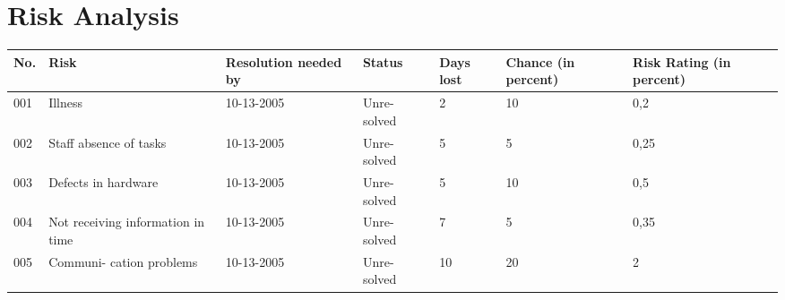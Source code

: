 \section{Risk Analysis}

\begin{tabularx}{\linewidth}{|l|p{2.5cm}|p{1.5cm}|p{1.2cm}|p{0.9cm}|p{1cm}|X|}
\hline
\textbf{No.} & \textbf{Risk} & \textbf{Resolution needed by}& \textbf{Status}& \textbf{Days lost}& \textbf{Chance (in percent)}& \textbf{Risk Rating (in percent)}\\
\hline
001 & Illness & 10-13-2005 & Unre- solved & 2 & 10 & 0,2\\
\hline
002 & Staff absence of tasks & 10-13-2005 & Unre- solved & 5 & 5 & 0,25\\
\hline
003 & Defects in hardware & 10-13-2005 & Unre- solved & 5 & 10 & 0,5\\
\hline
004 & Not receiving information in time & 10-13-2005 & Unre- solved & 7 & 5 & 0,35\\
\hline
005 & Communi- cation problems & 10-13-2005 & Unre- solved & 10 & 20 & 2\\
\hline
\end{tabularx}